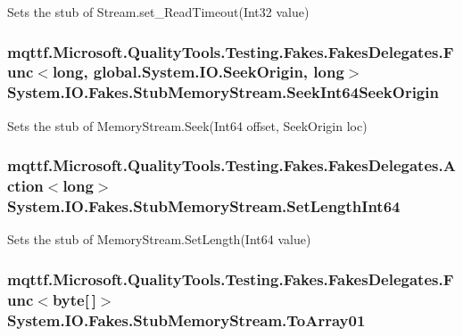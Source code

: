 Sets the stub of Stream.\-set\-\_\-\-Read\-Timeout(\-Int32 value)

\hypertarget{class_system_1_1_i_o_1_1_fakes_1_1_stub_memory_stream_aef1e453d44e9b3bd179a2c5610452beb}{
\subsubsection[{Seek\-Int64\-Seek\-Origin}]{\setlength{\rightskip}{0pt plus 5cm}mqttf.\-Microsoft.\-Quality\-Tools.\-Testing.\-Fakes.\-Fakes\-Delegates.\-Func$<$long, global.\-System.\-I\-O.\-Seek\-Origin, long$>$ System.\-I\-O.\-Fakes.\-Stub\-Memory\-Stream.\-Seek\-Int64\-Seek\-Origin}}\label{class_system_1_1_i_o_1_1_fakes_1_1_stub_memory_stream_aef1e453d44e9b3bd179a2c5610452beb}


Sets the stub of Memory\-Stream.\-Seek(\-Int64 offset, Seek\-Origin loc)

\hypertarget{class_system_1_1_i_o_1_1_fakes_1_1_stub_memory_stream_aa81a2f53f351a78d2e134050667ccd32}{
\subsubsection[{Set\-Length\-Int64}]{\setlength{\rightskip}{0pt plus 5cm}mqttf.\-Microsoft.\-Quality\-Tools.\-Testing.\-Fakes.\-Fakes\-Delegates.\-Action$<$long$>$ System.\-I\-O.\-Fakes.\-Stub\-Memory\-Stream.\-Set\-Length\-Int64}}\label{class_system_1_1_i_o_1_1_fakes_1_1_stub_memory_stream_aa81a2f53f351a78d2e134050667ccd32}


Sets the stub of Memory\-Stream.\-Set\-Length(\-Int64 value)

\hypertarget{class_system_1_1_i_o_1_1_fakes_1_1_stub_memory_stream_afebb7b674b5fa0298cd17fa27f8d3781}{
\subsubsection[{To\-Array01}]{\setlength{\rightskip}{0pt plus 5cm}mqttf.\-Microsoft.\-Quality\-Tools.\-Testing.\-Fakes.\-Fakes\-Delegates.\-Func$<$byte\mbox{[}$\,$\mbox{]}$>$ System.\-I\-O.\-Fakes.\-Stub\-Memory\-Stream.\-To\-Array01}}\label{class_system_1_1_i_o_1_1_fakes_1_1_stub_memory_stream_afebb7b674b5fa0298cd17fa27f8d3781}


